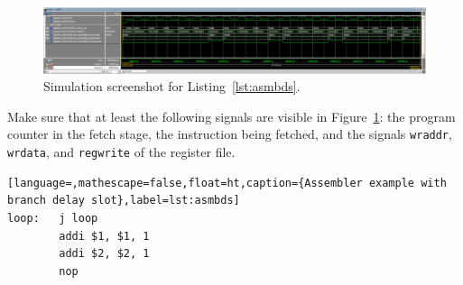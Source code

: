 
\begin{figure}[ht!]
  \centering
  \includegraphics[width=1.0\linewidth]{screenshots/branchhazards.PNG}
  \caption{Simulation screenshot for Listing~\ref{lst:asmbds}.}
  \label{fig:sim2}
\end{figure}

Make sure that at least the following signals are visible in
Figure~\ref{fig:sim2}: the program counter in the fetch stage, the
instruction being fetched, and the signals \texttt{wraddr},
\texttt{wrdata}, and \texttt{regwrite} of the register file.

\begin{lstlisting}[language=,mathescape=false,float=ht,caption={Assembler example with branch delay slot},label=lst:asmbds]
loop:   j loop
        addi $1, $1, 1
        addi $2, $2, 1
        nop
\end{lstlisting}

